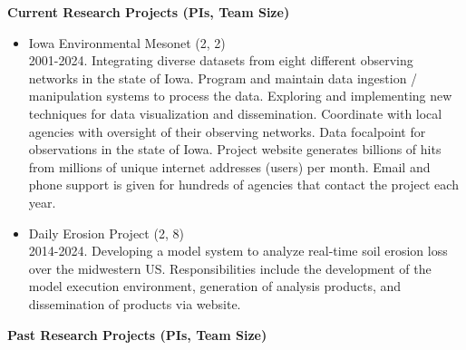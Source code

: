 \documentclass[11pt]{article}
\begin{document}
\vspace*{0.25in}
\Large \bf Current Research Projects (PIs, Team Size)
\normalsize \sf
\begin{itemize}
\item Iowa Environmental Mesonet (2, 2)\\
2001-2024. Integrating diverse datasets from eight
different observing networks in the state of Iowa.  Program and maintain data
ingestion / manipulation systems to process the data. Exploring and implementing 
new techniques for data visualization and dissemination.  Coordinate with local
agencies with oversight of their observing networks.  Data focalpoint for 
observations in the state of Iowa. Project website generates billions of hits 
from millions of unique internet addresses (users) per month.  Email and 
phone support is given for hundreds of agencies that contact the project each
year.
\item Daily Erosion Project (2, 8)\\
2014-2024. Developing a model system to analyze real-time soil erosion loss over the 
midwestern US.  Responsibilities include the development of the model execution
environment, generation of analysis products, and dissemination of products 
via website.
\end{itemize}
\vspace*{0.25in}
\Large \bf Past Research Projects (PIs, Team Size)
\normalsize \sf
\end{document}
